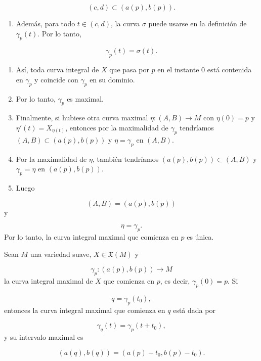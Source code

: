 \begin{bookproof}{}
\[
(c,d)\subset(a(p),b(p)).
\]
\begin{enumerate}[start=32]
\item Además, para todo $t\in(c,d)$, la curva $\sigma$ puede usarse en la definición de $\gamma_p(t)$. Por lo tanto,
\end{enumerate}
\[
\gamma_p(t)=\sigma(t).
\]
\begin{enumerate}[start=33]
\item Así, toda curva integral de $X$ que pasa por $p$ en el instante $0$ está contenida en $\gamma_p$ y coincide con $\gamma_p$ en su dominio.
\item Por lo tanto, $\gamma_p$ es maximal.
\item Finalmente, si hubiese otra curva maximal $\eta:(A,B)\to M$ con $\eta(0)=p$ y $\eta'(t)=X_{\eta(t)}$, entonces por la maximalidad de $\gamma_p$ tendríamos $(A,B)\subset(a(p),b(p))$ y $\eta=\gamma_p$ en $(A,B)$.
\item Por la maximalidad de $\eta$, también tendríamos $(a(p),b(p))\subset(A,B)$ y $\gamma_p=\eta$ en $(a(p),b(p))$.
\item Luego
\end{enumerate}
\[
(A,B)=(a(p),b(p))
\]
y

\[
\eta=\gamma_p.
\]
Por lo tanto, la curva integral maximal que comienza en $p$ es única.

\bookqed
\end{bookproof}
\begin{booklemma}{}
Sean $M$ una variedad suave, $X\in\mathfrak{X}(M)$ y

\[
\gamma_p:(a(p),b(p))\longrightarrow M
\]
la curva integral maximal de $X$ que comienza en $p$, es decir, $\gamma_p(0)=p$. Si

\[
q=\gamma_p(t_0),
\]
entonces la curva integral maximal que comienza en $q$ está dada por

\[
\gamma_q(t)=\gamma_p(t+t_0),
\]
y su intervalo maximal es

\[
(a(q),b(q))=(a(p)-t_0,b(p)-t_0).
\]
\end{booklemma}
